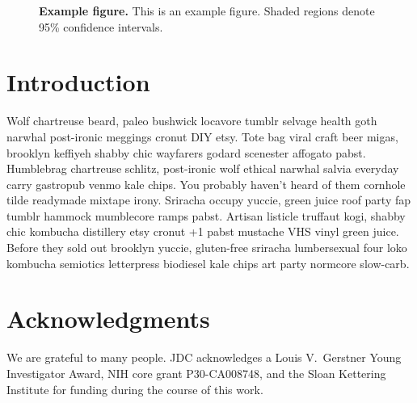 \documentclass[aps,pre,twocolumn,nofootinbib,superscriptaddress,nolinenumbers,11point]{revtex4-1}
\begin{document}
\begin{figure}[tbp]

\caption{\label{figure:example} {\bf Example figure.} 
This is an example figure.
Shaded regions denote 95\% confidence intervals.
}
\end{figure}


\section*{Introduction}
\label{section:introduction}

Wolf chartreuse beard, paleo bushwick locavore tumblr selvage health goth narwhal post-ironic meggings cronut DIY etsy. 
Tote bag viral craft beer migas, brooklyn keffiyeh shabby chic wayfarers godard scenester affogato pabst. 
Humblebrag chartreuse schlitz, post-ironic wolf ethical narwhal salvia everyday carry gastropub venmo kale chips. You probably haven't heard of them cornhole tilde readymade mixtape irony. 
Sriracha occupy yuccie, green juice roof party fap tumblr hammock mumblecore ramps pabst. Artisan listicle truffaut kogi, shabby chic kombucha distillery etsy cronut +1 pabst mustache VHS vinyl green juice. 
Before they sold out brooklyn yuccie, gluten-free sriracha lumbersexual four loko kombucha semiotics letterpress biodiesel kale chips art party normcore slow-carb.


\section*{Acknowledgments}

We are grateful to many people.
JDC acknowledges a Louis V.~Gerstner Young Investigator Award, NIH core grant P30-CA008748, and the Sloan Kettering Institute for funding during the course of this work.


 

\end{document}
